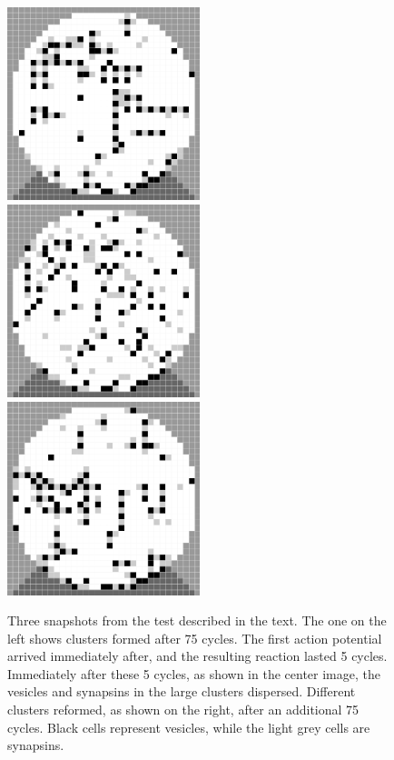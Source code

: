 \documentclass{acm_proc_article-sp}
\begin{document}
\begin{figure}[ht]
\centering
\includegraphics[width=56mm]{VS_Test_0600.png}
\includegraphics[width=56mm]{VS_Test_0641.png}
\includegraphics[width=56mm]{VS_Test_1240.png}
\caption{Three snapshots from the test described 
in the text.  The one on the left shows clusters 
formed after 75 cycles.  The first action potential 
arrived immediately after, and the resulting reaction
lasted 5 cycles.  Immediately after these 5 cycles, 
as shown in the center image, the vesicles and synapsins 
in the large clusters dispersed.  Different clusters
reformed, as shown on the right, after an additional 
75 cycles.  Black cells represent vesicles, while the 
light grey cells are synapsins. }
\label{fig:Results}
\end{figure}
\end{document}
